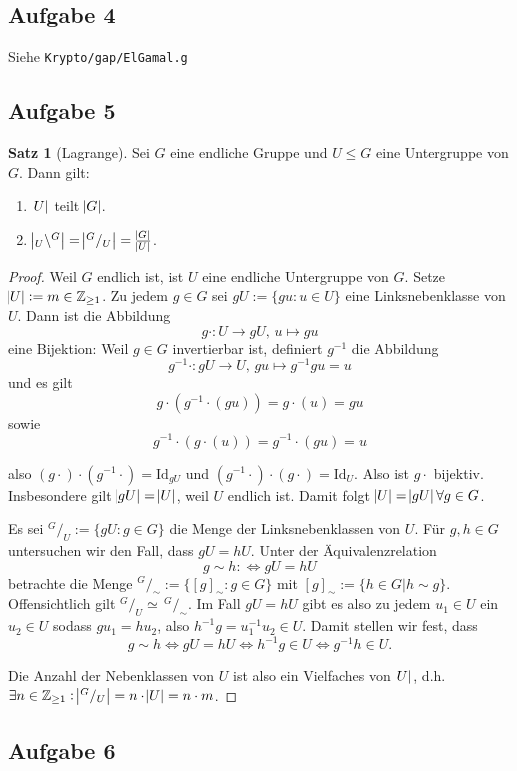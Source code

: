 \documentclass[a4paper,12pt,twoside]{article}
\theoremstyle{definition}
\newtheorem{satz}{Satz}[subsection]
\begin{document}
\subsection{Aufgabe 4}
Siehe \texttt{Krypto/gap/ElGamal.g}
\subsection{Aufgabe 5}
\begin{satz}[Lagrange]
Sei $G$ eine endliche Gruppe und $U \leq G$ eine Untergruppe von $G$. Dann gilt:
\begin{enumerate}
\renewcommand{\labelenumi}{(\theenumi)}
\item $\abs{U}$ teilt $\abs{G}$.
\item $\abs{_U \backslash ^G} = \abs{^G/_U} = \frac{\abs{G}}{\abs{U}}$.
\end{enumerate}
\end{satz}
\begin{proof}
Weil $G$ endlich ist, ist $U$ eine endliche Untergruppe von $G$. Setze $\abs{U} := m \in \mathbb{Z}_{\geq1}$. Zu jedem $g \in G$ sei
$gU := \{ gu : u \in U \}$ eine Linksnebenklasse von $U$.
Dann ist die Abbildung
\[
g\cdot : U \rightarrow gU,\, u \mapsto gu
\]
eine Bijektion: Weil $g \in G$ invertierbar ist, definiert $g^{-1}$ die Abbildung
\[
g^{-1}\cdot : gU \rightarrow U,\, gu \mapsto g^{-1}gu = u
\]
und es gilt
\[
g\cdot ( g^{-1}\cdot( gu ) ) = g\cdot ( u ) = gu
\]
sowie
\[
g^{-1}\cdot( g\cdot( u ) ) = g^{-1}\cdot( gu ) = u
\]

also $(g\cdot)\cdot(g^{-1}\cdot) = \mathrm{Id}_{gU}$ und $(g^{-1}\cdot)\cdot(g\cdot) = \mathrm{Id}_{U}$.
Also ist $g\cdot$ bijektiv. Insbesondere gilt $\abs{gU} = \abs{U}$, weil $U$ endlich ist.
Damit folgt $\abs{U} = \abs{gU} \forall g \in G$. 

Es sei $^G/_U := \{ gU : g \in G \}$ die Menge der Linksnebenklassen von $U$.
Für $g, h \in G$ untersuchen wir den Fall, dass $gU = hU$.
Unter der Äquivalenzrelation
\[
g \sim h :\Leftrightarrow gU = hU
\]
betrachte die Menge $^G/_\sim := \{ [g]_\sim : g \in G \}$ mit $[g]_\sim := \{ h \in G | h \sim g \}$. Offensichtlich gilt $^G/_U \simeq \,^G/_\sim$.
Im Fall $gU = hU$ gibt es also zu jedem $u_{1} \in U$ ein $u_{2} \in U$ sodass $gu_{1} = hu_{2}$, also $h^{-1}g = u_{1}^{-1}u_{2} \in U$. Damit
stellen wir fest, dass
\[
g \sim h \Leftrightarrow gU = hU \Leftrightarrow h^{-1}g \in U \Leftrightarrow g^{-1}h \in U.
\]


Die Anzahl der Nebenklassen von $U$ ist also ein Vielfaches von $\abs{U}$, d.h. $\exists n \in \mathbb{Z}_{\geq1} : \abs{^G/_U} = n\cdot \abs{U} = n\cdot m$.

\end{proof}

\subsection{Aufgabe 6}
\end{document}
